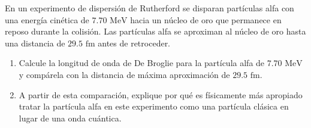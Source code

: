 \item En un experimento de dispersión de Rutherford se disparan partículas alfa con una energía cinética de $7.70\text{ MeV}$ hacia un núcleo de oro que permanece en reposo durante la colisión. Las partículas alfa se aproximan al núcleo de oro hasta una distancia de $29.5\text{ fm}$ antes de retroceder.
\begin{enumerate}
    \item Calcule la longitud de onda de De Broglie para la partícula alfa de $7.70\text{ MeV}$ y compárela con la distancia de máxima aproximación de $29.5\text{ fm}$.
    \item A partir de esta comparación, explique por qué es físicamente más apropiado tratar la partícula alfa en este experimento como una partícula clásica en lugar de una onda cuántica.
\end{enumerate}